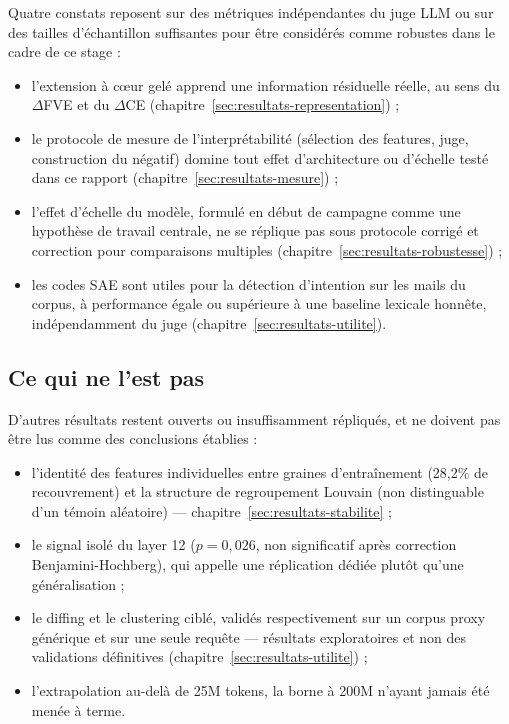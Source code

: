 \documentclass[11pt]{article}
\begin{document}
Quatre constats reposent sur des métriques indépendantes du juge LLM ou sur
des tailles d'échantillon suffisantes pour être considérés comme robustes
dans le cadre de ce stage :
\begin{itemize}
  \item l'extension à cœur gelé apprend une information résiduelle réelle,
  au sens du $\Delta$FVE et du $\Delta$CE (chapitre~\ref{sec:resultats-representation}) ;
  \item le protocole de mesure de l'interprétabilité (sélection des
  features, juge, construction du négatif) domine tout effet d'architecture
  ou d'échelle testé dans ce rapport (chapitre~\ref{sec:resultats-mesure}) ;
  \item l'effet d'échelle du modèle, formulé en début de campagne comme une
  hypothèse de travail centrale, ne se réplique pas sous protocole corrigé
  et correction pour comparaisons multiples (chapitre~\ref{sec:resultats-robustesse}) ;
  \item les codes SAE sont utiles pour la détection d'intention sur les
  mails du corpus, à performance égale ou supérieure à une baseline
  lexicale honnête, indépendamment du juge (chapitre~\ref{sec:resultats-utilite}).
\end{itemize}

\subsection{Ce qui ne l'est pas}

D'autres résultats restent ouverts ou insuffisamment répliqués, et ne
doivent pas être lus comme des conclusions établies :
\begin{itemize}
  \item l'identité des features individuelles entre graines d'entraînement
  (28,2\% de recouvrement) et la structure de regroupement Louvain (non
  distinguable d'un témoin aléatoire) --- chapitre~\ref{sec:resultats-stabilite} ;
  \item le signal isolé du layer 12 ($p=0{,}026$, non significatif après
  correction Benjamini-Hochberg), qui appelle une réplication dédiée plutôt
  qu'une généralisation ;
  \item le diffing et le clustering ciblé, validés respectivement sur un
  corpus proxy générique et sur une seule requête --- résultats
  exploratoires et non des validations définitives (chapitre~\ref{sec:resultats-utilite}) ;
  \item l'extrapolation au-delà de 25M tokens, la borne à 200M n'ayant
  jamais été menée à terme.
\end{itemize}
\end{document}
